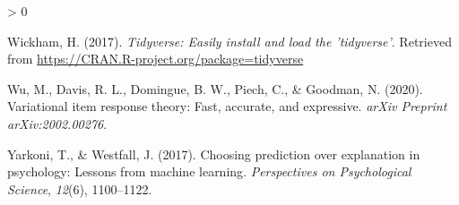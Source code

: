 \documentclass[
  english,
  man,floatsintext]{apa7}
\newlength{\cslhangindent}
\newenvironment{CSLReferences}[2] %
 {%
  \setlength{\parindent}{0pt}
  \ifodd #1 \everypar{\setlength{\hangindent}{\cslhangindent}}\ignorespaces\fi
  \ifnum #2 > 0
  \setlength{\parskip}{#2\baselineskip}
  \fi
 }%
 {}
\begin{document}
\begin{CSLReferences}{1}{0}
\leavevmode\hypertarget{ref-tidy}{}%
Wickham, H. (2017). \emph{Tidyverse: Easily install and load the 'tidyverse'}. Retrieved from \url{https://CRAN.R-project.org/package=tidyverse}

\leavevmode\hypertarget{ref-wu2020variational}{}%
Wu, M., Davis, R. L., Domingue, B. W., Piech, C., \& Goodman, N. (2020). Variational item response theory: Fast, accurate, and expressive. \emph{arXiv Preprint arXiv:2002.00276}.

\leavevmode\hypertarget{ref-yarkoni2017choosing}{}%
Yarkoni, T., \& Westfall, J. (2017). Choosing prediction over explanation in psychology: Lessons from machine learning. \emph{Perspectives on Psychological Science}, \emph{12}(6), 1100--1122.

\end{CSLReferences}

\endgroup
\end{document}
